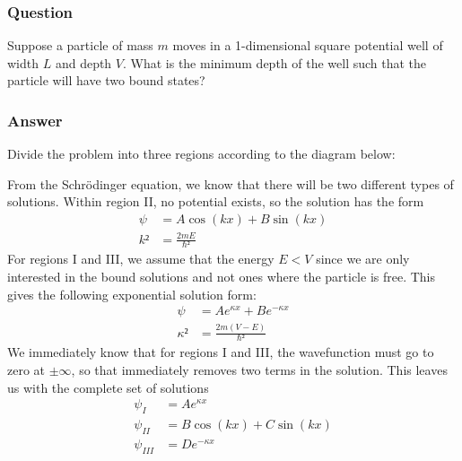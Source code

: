 \subsubsection{Question}

Suppose a particle of mass $m$ moves in a 1-dimensional square potential
well of width $L$ and depth $V$. What is the minimum depth of the well such
that the particle will have two bound states?

\subsubsection{Answer}

Divide the problem into three regions according to the diagram below:
\begin{figure}[H]
    \centering
\end{figure}

From the Schrödinger equation, we know that there will be two different types
of solutions. Within region II, no potential exists, so the solution has
the form
\begin{align*}
    ψ &= A\cos (kx) + B\sin (kx) \\
    k² &= \frac{2mE}{ℏ²}
\end{align*}
For regions I and III, we assume that the energy $E < V$ since we are only
interested in the bound solutions and not ones where the particle is free.
This gives the following exponential solution form:
\begin{align*}
    ψ &= Ae^{κx} + Be^{-κx} \\
    κ² &= \frac{2m(V-E)}{ℏ²}
\end{align*}
We immediately know that for regions I and III, the wavefunction must go to
zero at $±∞$, so that immediately removes two terms in the solution. This
leaves us with the complete set of solutions
\begin{align*}
    ψ_{I}   &= Ae^{κx} \\
    ψ_{II}  &= B\cos(kx) + C\sin(kx) \\
    ψ_{III} &= De^{-κx}
\end{align*}

